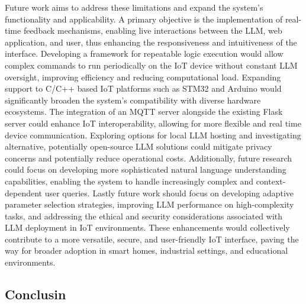 \documentclass{ieeeaccess}
\begin{document}
Future work aims to address these limitations and expand the system's functionality and applicability. A primary objective is the implementation of real-time feedback mechanisms, enabling live interactions between the LLM, web application, and user, thus enhancing the responsiveness and intuitiveness of the interface. Developing a framework for repeatable logic execution would allow complex commands to run periodically on the IoT device without constant LLM oversight, improving efficiency and reducing computational load. Expanding support to C/C++ based IoT platforms such as STM32 and Arduino would significantly broaden the system's compatibility with diverse hardware ecosystems. The integration of an MQTT server alongside the existing Flask server could enhance IoT interoperability, allowing for more flexible and real time device communication. Exploring options for local LLM hosting and investigating alternative, potentially open-source LLM solutions could mitigate privacy concerns and potentially reduce operational costs. Additionally, future research could focus on developing more sophisticated natural language understanding capabilities, enabling the system to handle increasingly complex and context-dependent user queries. Lastly future work should focus on developing adaptive parameter selection strategies, improving LLM performance on high-complexity tasks, and addressing the ethical and security considerations associated with LLM deployment in IoT environments. These enhancements would collectively contribute to a more versatile, secure, and user-friendly IoT interface, paving the way for broader adoption in smart homes, industrial settings, and educational environments. 
\subsection{Conclusin}
\end{document}
